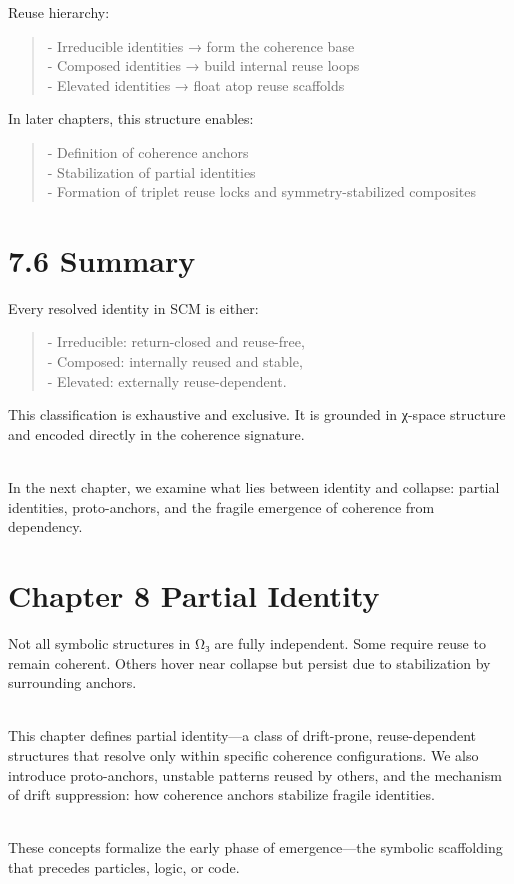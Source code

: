 Reuse hierarchy:

\begin{quote}
- Irreducible identities → form the coherence base\\
- Composed identities → build internal reuse loops\\
- Elevated identities → float atop reuse scaffolds
\end{quote}

In later chapters, this structure enables:

\begin{quote}
- Definition of coherence anchors\\
- Stabilization of partial identities\\
- Formation of triplet reuse locks and symmetry-stabilized composites
\end{quote}

\section{7.6 \textbar{} Summary}\label{summary-5}

Every resolved identity in SCM is either:

\begin{quote}
- Irreducible: return-closed and reuse-free,\\
- Composed: internally reused and stable,\\
- Elevated: externally reuse-dependent.
\end{quote}

This classification is exhaustive and exclusive. It is grounded in
χ-space structure and encoded directly in the coherence signature.\\
\strut \\
In the next chapter, we examine what lies between identity and collapse:
partial identities, proto-anchors, and the fragile emergence of
coherence from dependency.

\section{Chapter 8 \textbar{} Partial
Identity}\label{chapter-8-partial-identity}

Not all symbolic structures in Ω₃ are fully independent. Some require
reuse to remain coherent. Others hover near collapse but persist due to
stabilization by surrounding anchors.\\
\strut \\
This chapter defines partial identity---a class of drift-prone,
reuse-dependent structures that resolve only within specific coherence
configurations. We also introduce proto-anchors, unstable patterns
reused by others, and the mechanism of drift suppression: how coherence
anchors stabilize fragile identities.\\
\strut \\
These concepts formalize the early phase of emergence---the symbolic
scaffolding that precedes particles, logic, or code.

